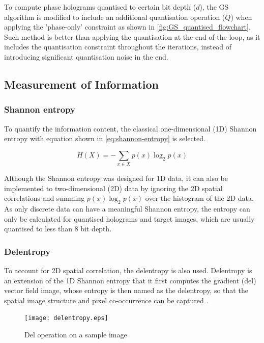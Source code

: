 	To compute phase holograms quantised to certain bit depth ($d$), the GS algorithm is modified to include an additional quantisation operation ($Q$) when applying the 'phase-only' constraint as shown in \cref{fig:GS_quantised_flowchart}. Such method is better than applying the quantisation at the end of the loop, as it includes the quantisation constraint throughout the iterations, instead of introducing significant quantisation noise in the end.



\subsection{Measurement of Information}
\subsubsection{Shannon entropy}
	To quantify the information content, the classical one-dimensional (1D) Shannon entropy \cite{Shannon1948} with equation shown in \cref{eq:shannon-entropy} is selected.

	\begin{equation}
		H(X) = -\sum_{x\in X} p(x)\log_2p(x)
		\label{eq:shannon-entropy}
	\end{equation}

	Although the Shannon entropy was designed for 1D data, it can also be implemented to two-dimensional (2D) data by ignoring the 2D spatial correlations and summing $p(x)\log_2p(x)$ over the histogram of the 2D data. As only discrete data can have a meaningful Shannon entropy, the entropy can only be calculated for quantised holograms and target images, which are usually quantised to less than 8 bit depth.


\subsubsection{Delentropy} \label{sec:Delentropy}
	To account for 2D spatial correlation, the delentropy \cite{Larkin2016} is also used. Delentropy is an extension of the 1D Shannon entropy that it first computes the gradient (del) vector field image, whose entropy is then named as the delentropy, so that the spatial image structure and pixel co-occurrence can be captured \cite{Larkin2016}.

	\begin{figure} [H]
	   \begin{center}
	   \texttt{[image: delentropy.eps]}
	   \end{center}
	   \caption{\label{fig:delentropy} Del operation on a sample image}
	\end{figure}


